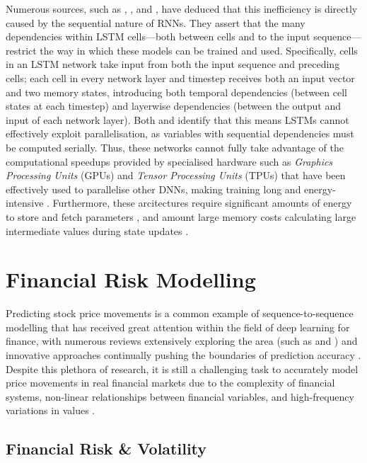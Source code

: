 \documentclass[a4paper, 11pt]{report}
\begin{document}
    Numerous sources, such as \citet{cao-2017}, \citet{feliz-2021}, and \citet{zhang-2021}, have deduced that this inefficiency is directly caused by the sequential nature of RNNs. They assert that the many dependencies within LSTM cells---both between cells and to the input sequence---restrict the way in which these models can be trained and used. Specifically, cells in an LSTM network take input from both the input sequence and preceding cells; each cell in every network layer and timestep receives both an input vector and two memory states, introducing both temporal dependencies (between cell states at each timestep) and layerwise dependencies (between the output and input of each network layer). Both \citet{cao-2017} and \citet{feliz-2021} identify that this means LSTMs cannot effectively exploit parallelisation, as variables with sequential dependencies must be computed serially. Thus, these networks cannot fully take advantage of the computational speedups provided by specialised hardware such as \emph{Graphics Processing Units} (GPUs) and \emph{Tensor Processing Units} (TPUs) that have been effectively used to parallelise other DNNs, making training long and energy-intensive \citep{zhang-2021b}. Furthermore, these arcitectures require significant amounts of energy to store and fetch parameters \citep{feliz-2021}, and amount large memory costs calculating large intermediate values during state updates \citep{cao-2017}.


    \section{Financial Risk Modelling}

    Predicting stock price movements is a common example of sequence-to-sequence modelling that has received great attention within the field of deep learning for finance, with numerous reviews extensively exploring the area (such as \citet{sezer-2019} and \citet{jiang-2021}) and innovative approaches continually pushing the boundaries of prediction accuracy \citep{darapaneni-2022}. Despite this plethora of research, it is still a challenging task to accurately model price movements in real financial markets due to the complexity of financial systems, non-linear relationships between financial variables, and high-frequency variations in values \citep{timmermann-2004}.


    \subsection{Financial Risk \& Volatility}
\end{document}
